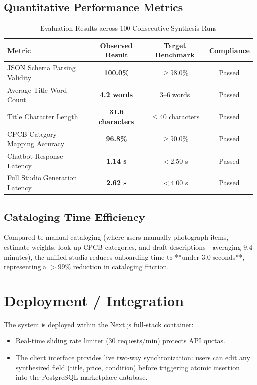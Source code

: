 \documentclass[12pt,a4paper]{article}
\begin{document}
\subsection{Quantitative Performance Metrics}
\begin{table}[H]
\centering
\caption{Evaluation Results across 100 Consecutive Synthesis Runs}
\label{tab:genai_results}
\begin{tabular}{lccc}
\toprule
\textbf{Metric} & \textbf{Observed Result} & \textbf{Target Benchmark} & \textbf{Compliance} \\
\midrule
JSON Schema Parsing Validity & \textbf{100.0\%} & $\ge 98.0\%$ & Passed \\
Average Title Word Count & \textbf{4.2 words} & $3\text{--}6$ words & Passed \\
Title Character Length & \textbf{31.6 characters} & $\le 40$ characters & Passed \\
CPCB Category Mapping Accuracy & \textbf{96.8\%} & $\ge 90.0\%$ & Passed \\
Chatbot Response Latency & \textbf{1.14 s} & $< 2.50$ s & Passed \\
Full Studio Generation Latency & \textbf{2.62 s} & $< 4.00$ s & Passed \\
\bottomrule
\end{tabular}
\end{table}

\subsection{Cataloging Time Efficiency}
Compared to manual cataloging (where users manually photograph items, estimate weights, look up CPCB categories, and draft descriptions—averaging $9.4$ minutes), the unified studio reduces onboarding time to **under 3.0 seconds**, representing a $>99\%$ reduction in cataloging friction.

\section{Deployment / Integration}
The system is deployed within the Next.js full-stack container:
\begin{itemize}
    \item Real-time sliding rate limiter ($30\text{ requests/min}$) protects API quotas.
    \item The client interface provides live two-way synchronization: users can edit any synthesized field (title, price, condition) before triggering atomic insertion into the PostgreSQL marketplace database.
\end{itemize}
\end{document}
